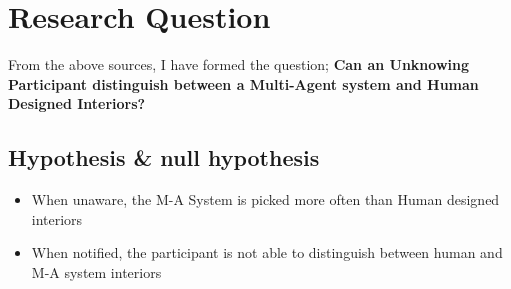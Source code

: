 \section{Research Question}

From the above sources, I have formed the question; \textbf{Can an Unknowing Participant distinguish between a Multi-Agent system and Human Designed Interiors?}

\subsection{Hypothesis \& null hypothesis}
\begin{itemize}
    \item When unaware, the M-A System is picked more often than Human designed interiors
    \item When notified, the participant is not able to distinguish between human and M-A system interiors
\end{itemize}